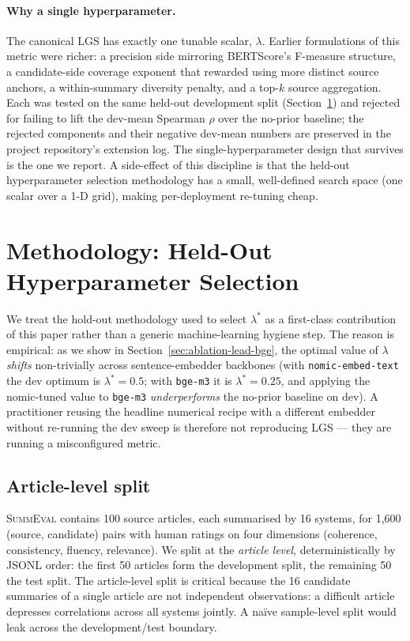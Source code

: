 \documentclass[journal]{IEEEtran}
\begin{document}
\paragraph{Why a single hyperparameter.}
The canonical LGS has exactly one tunable scalar, $\lambda$.
Earlier formulations of this metric were richer: a precision side
mirroring BERTScore's F-measure structure, a candidate-side
coverage exponent that rewarded using more distinct source
anchors, a within-summary diversity penalty, and a top-$k$ source
aggregation. Each was tested on the same held-out development
split (Section~\ref{sec:methodology}) and rejected for failing to
lift the dev-mean Spearman $\rho$ over the no-prior baseline; the
rejected components and their negative dev-mean numbers are
preserved in the project repository's extension log. The
single-hyperparameter design that survives is the one we report.
A side-effect of this discipline is that the held-out
hyperparameter selection methodology has a small, well-defined
search space (one scalar over a 1-D grid), making per-deployment
re-tuning cheap.

\section{Methodology: Held-Out Hyperparameter Selection}
\label{sec:methodology}

We treat the hold-out methodology used to select $\lambda^*$ as a
first-class contribution of this paper rather than a generic
machine-learning hygiene step. The reason is empirical: as we show
in Section~\ref{sec:ablation-lead-bge}, the optimal value of
$\lambda$ \emph{shifts} non-trivially across sentence-embedder
backbones (with \texttt{nomic-embed-text} the dev optimum is
$\lambda^*\!=\!0.5$; with \texttt{bge-m3} it is
$\lambda^*\!=\!0.25$, and applying the nomic-tuned value to
\texttt{bge-m3} \emph{underperforms} the no-prior baseline on dev).
A practitioner reusing the headline numerical recipe with a
different embedder without re-running the dev sweep is therefore
not reproducing LGS --- they are running a misconfigured metric.

\subsection{Article-level split}
\textsc{SummEval} contains 100 source articles, each summarised by
16 systems, for 1{,}600 (source, candidate) pairs with human
ratings on four dimensions (coherence, consistency, fluency,
relevance). We split at the \emph{article level}, deterministically
by JSONL order: the first 50 articles form the development split,
the remaining 50 the test split. The article-level split is
critical because the 16 candidate summaries of a single article
are not independent observations: a difficult article depresses
correlations across all systems jointly. A naïve sample-level
split would leak across the development/test boundary.
\end{document}

